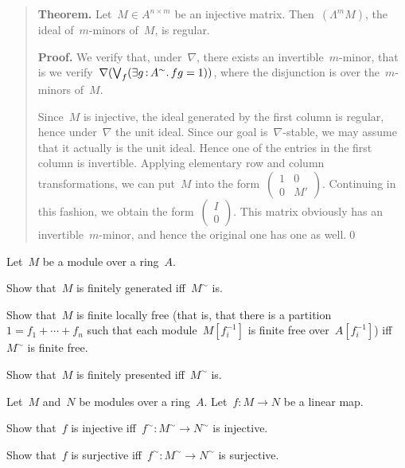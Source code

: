 \documentclass{ws-rv9x6}
\begin{document}
{\begin{exercise}
\begin{alphlist}[(f)]
\begin{quote}
\textbf{Theorem.} Let~$M \in A^{n \times m}$ be an injective matrix.
Then~$(\Lambda^m M)$, the ideal of~$m$-minors of~$M$, is regular.

\textbf{Proof.} We verify that, under~$\nabla$, there exists an
invertible~$m$-minor, that is we verify~$\nabla(\bigvee_f (\exists g\,{:}\,A^\sim\mathpunct{.}
fg=1))$, where the disjunction is over the~$m$-minors of~$M$.

Since~$M$ is injective, the ideal generated by the first column is regular,
hence under~$\nabla$ the unit ideal. Since our goal is~$\nabla$-stable, we may assume
that it actually is the unit ideal. Hence one of the entries in the first
column is invertible. Applying elementary row and column transformations, we
can put~$M$ into the
form~$\left(\begin{smallmatrix}1&0\\0&M'\end{smallmatrix}\right)$. Continuing
in this fashion, we obtain the
form~$\left(\begin{smallmatrix}I\\0\end{smallmatrix}\right)$. This matrix
obviously has an invertible~$m$-minor, and hence the original one has one as
well.\qed
\end{quote}
\end{alphlist}
\end{exercise}

\begin{exercise}%
\label{ex:bridging-modules}%
Let~$M$ be a module over a ring~$A$.
\begin{alphlist}[(c)]
\item Show that~$M$ is finitely generated iff~$M^\sim$ is.
\item\label{item:free} Show that~$M$ is finite locally free (that is, that there is a
partition~$1 = f_1 + \cdots + f_n$ such that each module~$M[f_i^{-1}]$ is
finite free over~$A[f_i^{-1}]$) iff~$M^\sim$ is finite free.
\item Show that~$M$ is finitely presented iff~$M^\sim$ is.
\end{alphlist}
\end{exercise}

\begin{exercise}%
Let~$M$ and~$N$ be modules over a ring~$A$. Let~$f : M \to N$ be a linear map.
\begin{alphlist}[(b)]
\item Show that~$f$ is injective iff~$f^\sim : M^\sim \to N^\sim$ is injective.
\item Show that~$f$ is surjective iff~$f^\sim : M^\sim \to N^\sim$ is surjective.
\end{alphlist}
\end{exercise}

}
\end{document}
